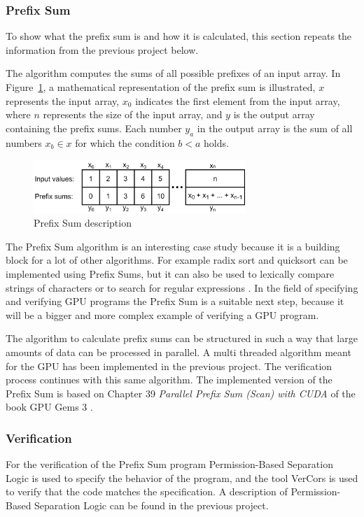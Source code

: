 \documentclass[a4paper]{article}
\begin{document}
\subsubsection{Prefix Sum}
To show what the prefix sum is and how it is calculated, this section repeats the information from the previous project\cite{bachelorThesis} below.

The algorithm computes the sums of all possible prefixes of an input array. In Figure~\ref{prefixsumexample}, a mathematical representation of the prefix sum is illustrated, $x$ represents the input array, $x_0$ indicates the first element from the input array, where $n$ represents the size of the input array, and $y$ is the output array containing the prefix sums. Each number $y_a$ in the output array is the sum of all numbers $x_b \in x$ for which the condition $b<a$ holds.

\begin{figure}[htb!]
	\centering
	\includegraphics[width=80mm]{../images/prefix-sum-v1.png}
	\caption{Prefix Sum description}
	\label{prefixsumexample}
\end{figure}

The Prefix Sum algorithm is an interesting case study because it is a building block for a lot of other algorithms. For example radix sort and quicksort can be implemented using Prefix Sums, but it can also be used to lexically compare strings of characters or to search for regular expressions \cite{Blelloch:PrefixSumApplications}. In the field of specifying and verifying GPU programs the Prefix Sum is a suitable next step, because it will be a bigger and more complex example of verifying a GPU program.

The algorithm to calculate prefix sums can be structured in such a way that large amounts of data can be processed in parallel. A multi threaded algorithm meant for the GPU has been implemented in the previous project. The verification process continues with this same algorithm. The implemented version of the Prefix Sum is based on Chapter 39 \emph{Parallel Prefix Sum (Scan) with CUDA} of the book GPU Gems 3 \cite{Nguyen:GPUGems3}.

\subsubsection{Verification}
For the verification of the Prefix Sum program Permission-Based Separation Logic is used to specify the behavior of the program, and the tool VerCors is used to verify that the code matches the specification. A description of Permission-Based Separation Logic can be found in the previous project\cite{bachelorThesis}. 
\end{document}
